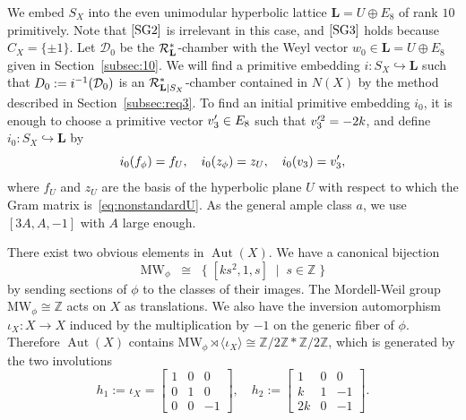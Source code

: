 \documentclass{amsart}
\theoremstyle{plain}
\theoremstyle{definition}
\theoremstyle{remark}
\numberwithin{equation}{section}
\numberwithin{table}{section}
\numberwithin{figure}{section}
\newcommand{\Z}{\mathord{\mathbb Z}}
\newcommand{\DDD}{\mathord{\mathcal D}}
\newcommand{\RRR}{\mathord{\mathcal R}}
\newcommand{\inj}{\hookrightarrow}
\newcommand{\set}[2]{\{\; {#1} \; \mid \; {#2} \;  \}}
\newcommand{\gen}[1]{\langle {#1}  \rangle}
\newcommand{\inv}{\sp{-1}}
\newcommand{\sprime}{\sp\prime}
\newcommand{\semidirectproduct}{\rtimes}
\newcommand{\OG}{\mathord{\mathrm {O}}}
\newcommand{\Aut}{\operatorname{\mathrm {Aut}}\nolimits}
\renewcommand{\L}{\mathord{\mathbf{L}}}
\newcommand{\MW}{\mathord{\mathrm{MW}}}
\newcommand{\aut}{\operatorname{\mathit {Aut}}\nolimits}
\newcommand{\Roots}{\RRR}
\newcommand{\sphyp}{\sp*}
\newcommand{\Nc}{N}
\newcommand{\assumptwo}{\mathord{\rm [SG2]}}
\newcommand{\assumpthree}{\mathord{\rm [SG3]}}
\begin{document}
%
\par
We embed $S_X$ into the even unimodular hyperbolic lattice $\L=U\oplus E_8$ of rank $10$ primitively.
Note that $\assumptwo$ is irrelevant in this case,
and $\assumpthree$ holds because $C_X=\{\pm 1\}$.
Let $\DDD_0$ be  the $\Roots_{\L}\sphyp$-chamber  
with the Weyl vector $w_0\in \L=U\oplus E_8$  given in Section~\ref{subsec:10}.
We will find 
a primitive embedding $i\colon S_X\inj \L$  such that
$D_0:=i\inv(\DDD_0)$ is an $\Roots_{\L|S_X}\sphyp$-chamber 
contained in $\Nc(X)$
by the method described in Section~\ref{subsec:req3}.
To find an initial  primitive embedding $i_0$,
it is enough to 
choose a primitive vector $v_3\sprime\in E_8$ such that
$v_3\sp{\prime 2}=-2k$,  and define  $i_0\colon S_X\inj \L$ 
 by
$$
i_0(f_\phi)=f_U, \quad
i_0(z_\phi)=z_U, \quad
i_0(v_3)=v_3\sprime,
$$
where $f_U$ and $z_U$ are the basis of the hyperbolic plane $U$ 
with respect to which the Gram matrix is~\eqref{eq:nonstandardU}. 
As the general ample class $a$, 
we use $[3A, A, -1]$ with $A$ large enough.
%
%
\par
There exist two obvious elements in $\Aut(X)$.
We have a canonical bijection 
$$
\MW_{\phi}\;\;\cong\;\;\set{[k s^2, 1, s]}{s\in\Z}
$$
by sending  sections of $\phi$ to the classes of their images.
The  Mordell-Weil group $\MW_{\phi}\cong \Z$ acts on $X$ as translations.
We also have the inversion automorphism $\iota_X\colon X\to X$
induced by the multiplication by $-1$
on the generic fiber of $\phi$.
Therefore $\Aut(X)$ contains $\MW_{\phi}\semidirectproduct\gen{\iota_X}\cong \Z/2\Z * \Z/2\Z$,
which is generated by the two involutions 
$$
h_1 :=\iota_X= \left[
\begin{array}{ccc}
1 & 0 & 0 \\
0 & 1 & 0\\
0 & 0 & -1
\end{array}\right],
\quad
h_2 := \left[
\begin{array}{ccc}
1 & 0 & 0 \\
k & 1 & -1\\
2k & 0 & -1
\end{array}\right].
$$
%
\end{document}
